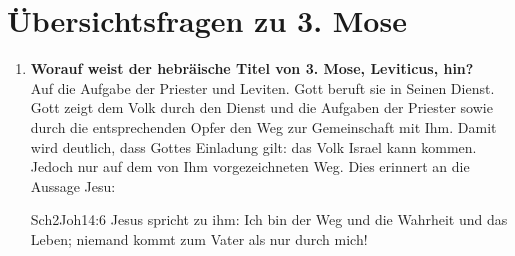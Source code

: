 \section{Übersichtsfragen zu 3. Mose}
\begin{enumerate}
    \item \textbf{Worauf weist der hebräische Titel von 3. Mose, Leviticus, hin?}\\
    Auf die Aufgabe der Priester und Leviten. Gott beruft sie in Seinen Dienst. Gott zeigt dem Volk durch den Dienst und die Aufgaben der Priester sowie durch die entsprechenden Opfer den Weg zur Gemeinschaft mit Ihm. Damit wird deutlich, dass Gottes Einladung gilt: das Volk Israel kann kommen. Jedoch nur auf dem von Ihm vorgezeichneten Weg. Dies erinnert an die Aussage Jesu:
\begin{bibeltext}{Sch2}{Joh}{14:6}
    Jesus spricht zu ihm: Ich bin der Weg und die Wahrheit und das Leben; niemand kommt zum Vater als nur durch mich!
\end{bibeltext}
\end{enumerate}